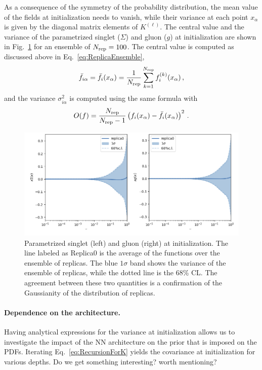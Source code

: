 \documentclass[11pt]{article}
\begin{document}
As a consequence of the symmetry of the probability distribution, the mean value of the fields at 
initialization needs to vanish, while their variance at each point $x_\alpha$ is given by the 
diagonal matrix elements of $K^{(\ell)}$. The central value and the variance of the 
parametrized singlet ($\Sigma$) and gluon ($g$) at initialization are shown in 
Fig.~\ref{fig:SingletGluonInit} for an ensemble of $N_{\rm rep}=100$. The central value is computed as 
discussed above in Eq.~\eqref{eq:ReplicaEnsemble}, 
\begin{align}
    \label{eq:MeanValAtInit}
    \bar{f}_{i\alpha} = \bar{f}_{i}(x_\alpha) = \frac{1}{N_{\rm rep}} \sum_{k=1}^{N_{\rm rep}} f^{(k)}_i(x_\alpha)\, ,
\end{align}
and the variance $\sigma^2_{i\alpha}$ is computed using the same formula with 
\begin{align}
    \label{eq:VarAtInit}
    O(f) = \frac{N_{\rm rep}}{N_{\rm rep}-1} \left(f_i(x_\alpha) - \bar{f}_{i}(x_\alpha)\right)^2\, .
\end{align}

\begin{figure}[!ht]
    \begin{center}
        \includegraphics[scale=0.4]{plots/NNPDFAtInit.png}
    \end{center}
    \caption{Parametrized singlet (left) and gluon (right) at initialization. The line labeled 
    as Replica0 is the average of the functions over the ensemble of replicas. The blue $1\sigma$ band 
    shows the variance of the ensemble of replicas, while the dotted line is the 68\% CL. 
    The agreement between these two quantities is a confirmation of the Gaussianity of the 
    distribution of replicas. 
    \label{fig:SingletGluonInit}
    }
\end{figure}

\paragraph{Dependence on the architecture.}
Having analytical expressions for the variance at initialization allows us to investigate the 
impact of the NN architecture on the prior that is imposed on the PDFs. Iterating 
Eq.~\eqref{eq:RecursionForK} yields the covariance at initialization for various depths. 
Do we get something interesting? worth mentioning? 
\end{document}
